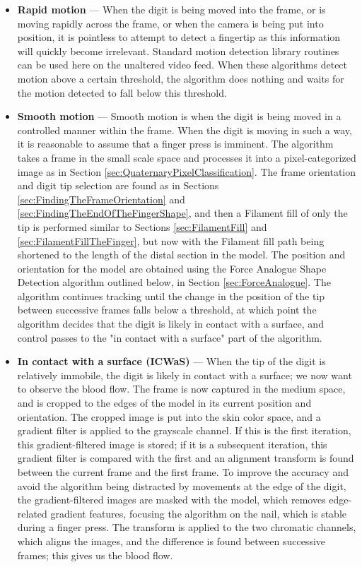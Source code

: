 \begin{itemize}
\item \textbf{Rapid motion} --- When the digit is being moved into the frame, or is moving rapidly across the frame, or when the camera is being put into position, it is pointless to attempt to detect a fingertip as this information will quickly become irrelevant. Standard motion detection library routines can be used here on the unaltered video feed. When these algorithms detect motion above a certain threshold, the algorithm does nothing and waits for the motion detected to fall below this threshold.
\item \textbf{Smooth motion} --- Smooth motion is when the digit is being moved in a controlled manner within the frame. When the digit is moving in such a way, it is reasonable to assume that a finger press is imminent. The algorithm takes a frame in the small scale space and processes it into a pixel-categorized image as in Section \ref{sec:QuaternaryPixelClassification}. The frame orientation and digit tip selection are found as in Sections \ref{sec:FindingTheFrameOrientation} and \ref{sec:FindingTheEndOfTheFingerShape}, and then a Filament fill of only the tip is performed similar to Sections \ref{sec:FilamentFill} and \ref{sec:FilamentFillTheFinger}, but now with the Filament fill path being shortened to the length of the distal section in the model. The position and orientation for the model are obtained using the Force Analogue Shape Detection algorithm outlined below, in Section \ref{sec:ForceAnalogue}. The algorithm continues tracking until the change in the position of the tip between successive frames falls below a threshold, at which point the algorithm decides that the digit is likely in contact with a surface, and control passes to the "in contact with a surface" part of the algorithm.
\item \textbf{In contact with a surface (ICWaS)} --- When the tip of the digit is relatively immobile, the digit is likely in contact with a surface; we now want to observe the blood flow. The frame is now captured in the medium space, and is cropped to the edges of the model in its current position and orientation. The cropped image is put into the skin color space, and a gradient filter is applied to the grayscale channel. If this is the first iteration, this gradient-filtered image is stored; if it is a subsequent iteration, this gradient filter is compared with the first and an alignment transform is found between the current frame and the first frame. To improve the accuracy and avoid the algorithm being distracted by movements at the edge of the digit, the gradient-filtered images are masked with the model, which removes edge-related gradient features, focusing the algorithm on the nail, which is stable during a finger press. The transform is applied to the two chromatic channels, which aligns the images, and the difference is found between successive frames; this gives us the blood flow. 
\end{itemize}

